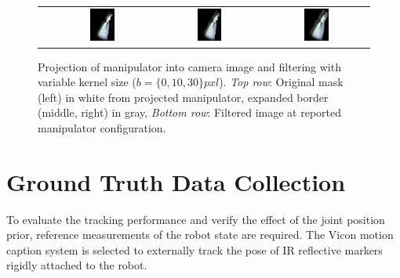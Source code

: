 \begin{figure}
\begin{tabular}{cc:c:c}
 & \includegraphics[width=0.25\textwidth]{images/filtering/rgb0.png} & \includegraphics[width=0.25\textwidth]{images/filtering/rgb10.png} & \includegraphics[width=0.25\textwidth]{images/filtering/rgb30.png} \\
\end{tabular}
\caption[Observation filtering]{Projection of manipulator into camera image and filtering with variable kernel size ($b=\{0,10,30\} \si{pxl}$). \textit{Top row}: Original mask (left) in white from projected manipulator, expanded border (middle, right) in gray, \textit{Bottom row}: Filtered image at reported manipulator configuration.}
\label{fig:filtered_perception}
\end{figure}

\section{Ground Truth Data Collection}

To evaluate the tracking performance and verify the effect of the joint position prior, reference measurements of the robot state are required. The Vicon motion caption system is selected to externally track the pose of IR reflective markers rigidly attached to the robot.

